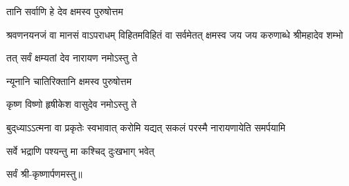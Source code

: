 
{तानि सर्वाणि हे देव क्षमस्व पुरुषोत्तम}

{श्रवणनयनजं वा मानसं वाऽपराधम्}
{विहितमविहितं वा सर्वमेतत् क्षमस्व}
{जय जय करुणाब्धे श्रीमहादेव शम्भो}

{तत् सर्वं क्षम्यतां देव नारायण नमोऽस्तु ते}

{न्यूनानि चातिरिक्तानि क्षमस्व पुरुषोत्तम}

{कृष्ण विष्णो हृषीकेश वासुदेव नमोऽस्तु ते}

{बुद्‌ध्याऽऽत्मना वा प्रकृतेः स्वभावात्}
{करोमि यद्यत् सकलं परस्मै}
{नारायणायेति समर्पयामि}

{सर्वे भद्राणि पश्यन्तु मा कश्चिद् दुःखभाग् भवेत्}

\centerline{सर्वं श्री-कृष्णार्पणमस्तु॥}

\closesection